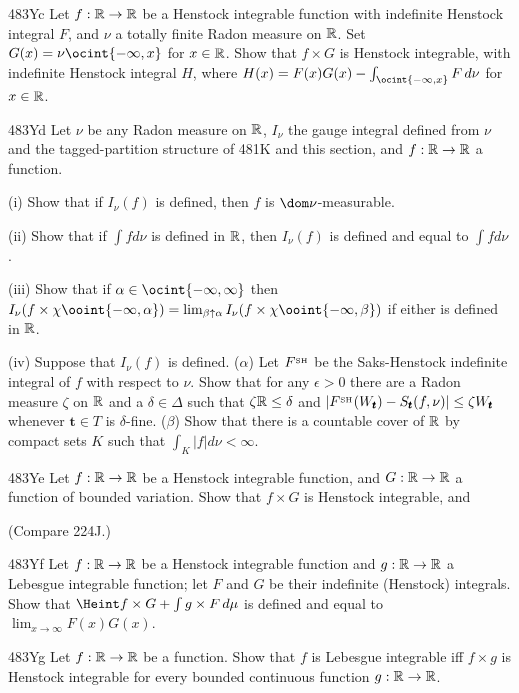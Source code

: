 {\spheader 483Yc Let $f:\Bbb R\to\Bbb R$ be a Henstock integrable
function with indefinite Henstock integral $F$, and $\nu$ a totally
finite Radon measure on $\Bbb R$.   Set $G(x)=\nu\ocint{-\infty,x}$ for
$x\in\Bbb R$.   Show that $f\times G$ is Henstock integrable, with
indefinite Henstock integral $H$, where
$H(x)=F(x)G(x)-\int_{\ocint{-\infty,x}}F\,d\nu$ for $x\in\Bbb R$.

\spheader 483Yd Let $\nu$ be any Radon measure on $\Bbb R$,
$I_{\nu}$ the gauge integral defined from $\nu$ and the
tagged-partition structure of 481K and this section, and
$f:\Bbb R\to\Bbb R$ a function.

\quad(i) Show that if $I_{\nu}(f)$ is defined, then $f$ is
$\dom\nu$-measurable.

\quad(ii) Show that if $\int fd\nu$ is
defined in $\Bbb R$, then $I_{\nu}(f)$ is defined and equal to
$\int fd\nu$.

\quad(iii) Show that if $\alpha\in\ocint{-\infty,\infty}$ then
$I_{\nu}(f\times\chi\ooint{-\infty,\alpha})
=\lim_{\beta\uparrow\alpha}
  I_{\nu}(f\times\chi\ooint{-\infty,\beta})$ if either is defined in
$\Bbb R$.

\quad(iv) Suppose that $I_{\nu}(f)$ is defined.   ($\alpha$) Let $F^{_{\text{SH}}}$ be
the Saks-Henstock indefinite integral of $f$ with respect to $\nu$.   Show
that for any $\epsilon>0$ there are a Radon measure $\zeta$ on $\Bbb R$
and a $\delta\in\Delta$ such that $\zeta\Bbb R\le\delta$ and
$|F^{_{\text{SH}}}(W_{\pmb{t}})-S_{\pmb{t}}(f,\nu)|\le\zeta W_{\pmb{t}}$ whenever
$\pmb{t}\in T$ is $\delta$-fine.
($\beta$) Show that there is a
countable cover of $\Bbb R$ by compact sets $K$ such that
$\int_K|f|d\nu<\infty$.

\spheader 483Ye Let $f:\Bbb R\to\Bbb R$ be a Henstock integrable
function, and $G:\Bbb R\to\Bbb R$ a function of bounded variation.
Show that $f\times G$ is Henstock integrable, and


\noindent(Compare 224J.)

\spheader 483Yf Let $f:\Bbb R\to\Bbb R$ be a Henstock integrable
function and $g:\Bbb R\to\Bbb R$ a Lebesgue integrable function;  let
$F$ and $G$ be their indefinite (Henstock) integrals.   Show that
$\Heint f\times G+\int g\times F\,d\mu$ is defined and equal to
$\lim_{x\to\infty}F(x)G(x)$.

\spheader 483Yg Let $f:\Bbb R\to\Bbb R$ be a function.   Show that $f$
is Lebesgue integrable iff $f\times g$ is Henstock integrable for every
bounded continuous function $g:\Bbb R\to\Bbb R$.

}
